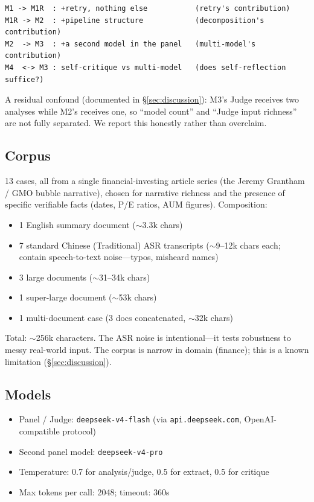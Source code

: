 \documentclass[11pt]{article}
\begin{document}
\begin{lstlisting}
M1 -> M1R  : +retry, nothing else           (retry's contribution)
M1R -> M2  : +pipeline structure            (decomposition's contribution)
M2  -> M3  : +a second model in the panel   (multi-model's contribution)
M4  <-> M3 : self-critique vs multi-model   (does self-reflection suffice?)
\end{lstlisting}

A residual confound (documented in \S\ref{sec:discussion}): M3's Judge receives
two analyses while M2's receives one, so ``model count'' and ``Judge input
richness'' are not fully separated. We report this honestly rather than
overclaim.

\subsection{Corpus}

13 cases, all from a single financial-investing article series (the Jeremy
Grantham / GMO bubble narrative), chosen for narrative richness and the
presence of specific verifiable facts (dates, P/E ratios, AUM figures).
Composition:

\begin{itemize}
  \item 1 English summary document ($\sim$3.3k chars)
  \item 7 standard Chinese (Traditional) ASR transcripts ($\sim$9--12k chars each;
        contain speech-to-text noise---typos, misheard names)
  \item 3 large documents ($\sim$31--34k chars)
  \item 1 super-large document ($\sim$53k chars)
  \item 1 multi-document case (3 docs concatenated, $\sim$32k chars)
\end{itemize}

Total: $\sim$256k characters. The ASR noise is intentional---it tests
robustness to messy real-world input. The corpus is narrow in domain (finance);
this is a known limitation (\S\ref{sec:discussion}).

\subsection{Models}

\begin{itemize}
  \item Panel / Judge: \texttt{deepseek-v4-flash} (via \texttt{api.deepseek.com},
        OpenAI-compatible protocol)
  \item Second panel model: \texttt{deepseek-v4-pro}
  \item Temperature: 0.7 for analysis/judge, 0.5 for extract, 0.5 for critique
  \item Max tokens per call: 2048; timeout: 360s
\end{itemize}
\end{document}
